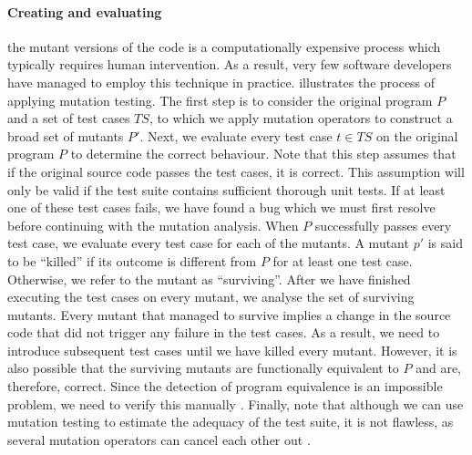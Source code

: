 \paragraph*{Creating and evaluating} the mutant versions of the code is a computationally expensive process which typically requires human intervention. As a result, very few software developers have managed to employ this technique in practice.  illustrates the process of applying mutation testing. The first step is to consider the original program $P$ and a set of test cases $TS$, to which we apply mutation operators to construct a broad set of mutants $P'$. Next, we evaluate every test case $t \in TS$ on the original program $P$ to determine the correct behaviour. Note that this step assumes that if the original source code passes the test cases, it is correct. This assumption will only be valid if the test suite contains sufficient thorough unit tests. If at least one of these test cases fails, we have found a bug which we must first resolve before continuing with the mutation analysis. When $P$ successfully passes every test case, we evaluate every test case for each of the mutants. A mutant $p'$ is said to be ``killed'' if its outcome is different from $P$ for at least one test case. Otherwise, we refer to the mutant as ``surviving''. After we have finished executing the test cases on every mutant, we analyse the set of surviving mutants. Every mutant that managed to survive implies a change in the source code that did not trigger any failure in the test cases. As a result, we need to introduce subsequent test cases until we have killed every mutant. However, it is also possible that the surviving mutants are functionally equivalent to $P$ and are, therefore, correct. Since the detection of program equivalence is an impossible problem, we need to verify this manually \cite{5487526, Offutt2001}. Finally, note that although we can use mutation testing to estimate the adequacy of the test suite, it is not flawless, as several mutation operators can cancel each other out \cite{evaluationoftestsuiteminimization}.

